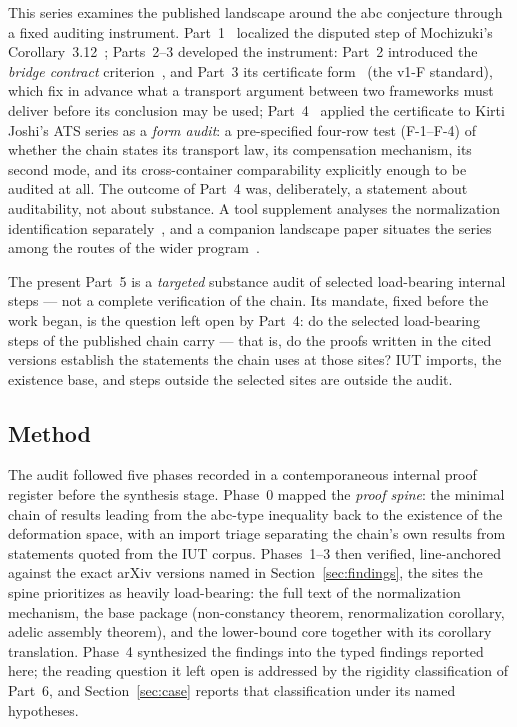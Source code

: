 \documentclass[11pt,a4paper]{article}
\theoremstyle{definition}
\theoremstyle{remark}
\begin{document}
This series examines the published landscape around the abc conjecture
through a fixed auditing instrument. Part~1~\cite{part1} localized the
disputed step of Mochizuki's Corollary~3.12~\cite{mochizukiIUT,scholzestix};
Parts~2--3 developed the instrument: Part~2 introduced the \emph{bridge
contract} criterion~\cite{part2}, and Part~3 its certificate form~\cite{part3}
(the v1-F standard), which fix in advance what a transport argument between
two frameworks must deliver before its conclusion may be used;
Part~4~\cite{part4}
applied the certificate to Kirti Joshi's ATS series as a \emph{form audit}:
a pre-specified four-row test (\mbox{F-1}--\mbox{F-4}) of whether the chain states its transport law,
its compensation mechanism, its second mode, and its cross-container
comparability explicitly enough to be audited at all. The outcome of Part~4
was, deliberately, a statement about auditability, not about substance. A
tool supplement analyses the normalization identification
separately~\cite{gnc}, and a companion landscape paper situates the series
among the routes of the wider program~\cite{landscapeA}.

The present Part~5 is a \emph{targeted} substance audit of selected
load-bearing internal steps --- not a complete verification of the chain.
Its mandate, fixed before the work began, is the question left open by
Part~4: do the selected load-bearing steps of the published chain carry ---
that is, do the proofs written in the cited versions establish the
statements the chain uses at those sites? IUT imports, the existence base,
and steps outside the selected sites are outside the audit.

\subsection{Method}

The audit followed five phases recorded in a contemporaneous internal proof
register before the synthesis stage. Phase~0 mapped the
\emph{proof spine}: the minimal chain of results leading from the abc-type
inequality back to the existence of the deformation space, with an import
triage separating the chain's own results from statements quoted from the
IUT corpus. Phases~1--3 then verified, line-anchored against the exact
arXiv versions named in Section~\ref{sec:findings}, the sites the spine
prioritizes as heavily load-bearing: the full text of the normalization
mechanism, the base package (non-constancy theorem, renormalization
corollary, adelic assembly theorem), and the lower-bound core together with
its corollary translation. Phase~4 synthesized the findings into the typed
findings reported here; the reading question it left open is addressed by
the rigidity classification of Part~6, and Section~\ref{sec:case} reports
that classification under its named hypotheses.
\end{document}
